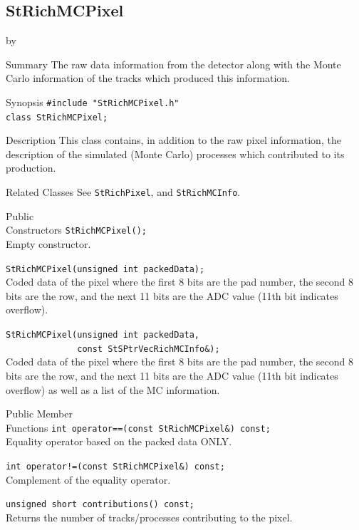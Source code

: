 \documentclass[twoside]{article}
\newcommand{\entrylabel}[1]{\mbox{\textbf{{#1}}}\hfil}%
\newenvironment{entry}
{\begin{list}{}%
    {\renewcommand{\makelabel}{\entrylabel}%
     \setlength{\labelwidth}{90pt}%
     \setlength{\leftmargin}{\labelwidth}
     \advance\leftmargin by \labelsep%
      }%
    }%
  {\end{list}}
\newcommand{\Entrylabel}[1]%
{\raisebox{0pt}[1ex][0pt]{\makebox[\labelwidth][l]%
    {\parbox[t]{\labelwidth}{\hspace{0pt}\textbf{{#1}}}}}}
\newenvironment{Entry}%
{\renewcommand{\entrylabel}{\Entrylabel}\begin{entry}}%
  {\end{entry}}
\begin{document}
\subsection{StRichMCPixel}
\label{sec:StRichMCPixel}
\begin{Entry}
\item[Summary] The raw data information from the detector
    along with the Monte Carlo information of the tracks which
    produced this information.
\item[Synopsis]
    \verb+#include "StRichMCPixel.h"+\\
    \verb+class StRichMCPixel;+\\
\item[Description] This class contains, in addition to the raw pixel
    information, the description of the simulated (Monte Carlo)
    processes which contributed to its production.
\item[Related Classes]
    See \texttt{StRichPixel}, and \texttt{StRichMCInfo}.
\item[Public\\ Constructors]
    \verb+StRichMCPixel();+\\
    Empty constructor.

    \verb+StRichMCPixel(unsigned int packedData);+\\
    Coded data of the pixel where the first 8 bits are the pad
    number, the second 8 bits are the row, and the next 11 bits
    are the ADC value (11th bit indicates overflow).

    \verb+StRichMCPixel(unsigned int packedData,+\\
    \verb+              const StSPtrVecRichMCInfo&);+\\
        Coded data of the pixel where the first 8 bits are the pad
    number, the second 8 bits are the row, and the next 11 bits
    are the ADC value (11th bit indicates overflow) as well as
    a list of the MC information.
\item[Public Member\\ Functions]
    \verb+int operator==(const StRichMCPixel&) const;+\\
    Equality operator based on the packed data ONLY.

    \verb+int operator!=(const StRichMCPixel&) const;+\\
    Complement of the equality operator.

    \verb+unsigned short contributions() const;+\\
    Returns the number of tracks/processes contributing
    to the pixel.


\end{Entry}
\end{document}
